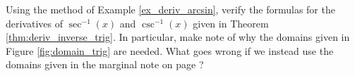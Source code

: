 {Using the method of Example \ref{ex_deriv_arcsin}, verify the formulas for the derivatives of $\sec^{-1}(x)$ and $\csc^{-1}(x)$ given in Theorem \ref{thm:deriv_inverse_trig}. In particular, make note of why the domains given in Figure \ref{fig:domain_trig} are needed. What goes wrong if we instead use the domains given in the marginal note on page \pageref{note:trig_domains}?\label{prob_inverse_trig}
}
{
}
